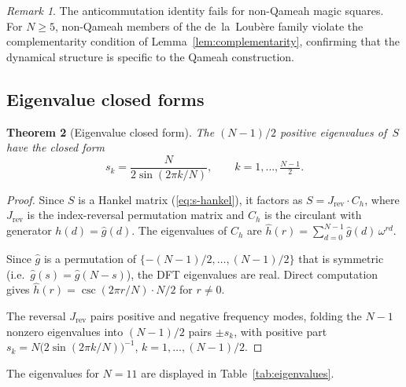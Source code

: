 \documentclass[aip,jmp,reprint,superscriptaddress,floatfix,nofootinbib]{revtex4-2}
\newtheorem{theorem}{Theorem}
\theoremstyle{definition}
\theoremstyle{remark}
\newtheorem{remark}[theorem]{Remark}
\begin{document}
\begin{remark}
The anticommutation identity fails for non-Qameah magic squares.
For $N \geq 5$, non-Qameah members of the de~la~Loub\`ere family violate the
complementarity condition of Lemma~\ref{lem:complementarity}, confirming
that the dynamical structure is specific to the Qameah construction.
\end{remark}

\subsection{Eigenvalue closed forms}

\begin{theorem}[Eigenvalue closed form]
\label{thm:eigenvalue-closedform}
The $(N{-}1)/2$ positive eigenvalues of~$S$ have the closed form
\begin{equation}\label{eq:sk-closedform}
  s_k = \frac{N}{2\sin(2\pi k/N)}, \qquad k = 1,\ldots,\tfrac{N{-}1}{2}.
\end{equation}
\end{theorem}

\begin{proof}
Since $S$ is a Hankel matrix (\eqref{eq:s-hankel}), it factors as
$S = J_{\mathrm{rev}} \cdot C_h$, where $J_{\mathrm{rev}}$ is the
index-reversal permutation matrix and $C_h$ is the circulant with
generator $h(d) = \hat{g}(d)$.  The eigenvalues of $C_h$ are
$\hat{h}(r) = \sum_{d=0}^{N-1} \hat{g}(d)\,\omega^{rd}$.

Since $\hat{g}$ is a permutation of $\{-(N{-}1)/2, \ldots, (N{-}1)/2\}$
that is symmetric (i.e.\ $\hat{g}(s) = \hat{g}(N{-}s)$), the DFT
eigenvalues are real.  Direct computation gives
$\hat{h}(r) = \csc(2\pi r/N) \cdot N/2$ for $r \neq 0$.

The reversal $J_{\mathrm{rev}}$ pairs positive and negative frequency
modes, folding the $N{-}1$ nonzero eigenvalues into $(N{-}1)/2$
pairs $\pm s_k$, with positive part
$s_k = N\bigl(2\sin(2\pi k/N)\bigr)^{-1}$, $k = 1,\ldots,(N{-}1)/2$.
\end{proof}

The eigenvalues for $N{=}11$ are displayed in Table~\ref{tab:eigenvalues}.
\end{document}
